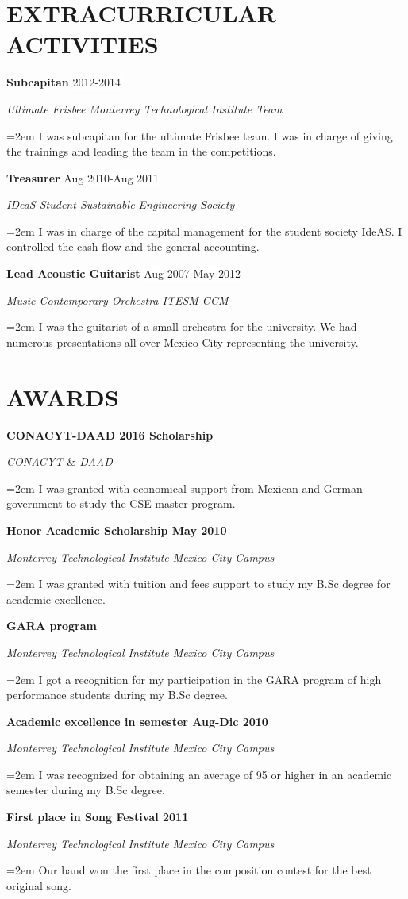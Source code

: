\documentclass[paper=a4,fontsize=11pt]{scrartcl} %
\newcommand{\sepspace}{\vspace*{1em}}		%
\newcommand{\NewPart}[1]{\section*{\uppercase{#1}}}
\newcommand{\EducationEntry}[4]{
		\noindent \textbf{#1} \hfill      %
		\colorbox{white}{%
			\parbox{15em}{%
			\hfill\color{black}#2}} \par  %
		\noindent \textit{#3} \par        %
		\noindent\hangindent=2em\hangafter=0 \small #4 %
		\normalsize \par}
\newcommand{\extraAct}[4]{				  %
		\noindent \textbf{#1} \hfill      %
		\colorbox{White}{\color{Black}#2} \par  %
		\noindent \textit{#3} \par              %
		\noindent\hangindent=2em\hangafter=0 \small #4 %
		\normalsize \par}
\begin{document}
\NewPart{Extracurricular Activities}{}



\extraAct{Subcapitan}{2012-2014}{Ultimate Frisbee Monterrey Technological Institute Team}{I was subcapitan for the ultimate Frisbee team. I was in charge of giving the trainings and leading the team in the competitions.}  
\sepspace

\extraAct{Treasurer}{Aug 2010-Aug 2011}{IDeaS Student Sustainable Engineering Society}{I was in charge of the capital management for the student society IdeAS. I controlled the cash flow and the general accounting.}
\sepspace

\extraAct{Lead Acoustic Guitarist}{Aug 2007-May 2012}{Music Contemporary Orchestra ITESM CCM}{I was the guitarist of a small orchestra for the university. We had numerous presentations all over Mexico City representing the university.}
\sepspace



\NewPart{Awards}{}

\extraAct{CONACYT-DAAD 2016 Scholarship}{}{CONACYT $\&$ DAAD}{I was granted with economical support from Mexican and German government to study the CSE master program.}
\sepspace

\extraAct{Honor Academic Scholarship May 2010}{}{Monterrey Technological Institute Mexico City Campus}{I was granted with tuition and fees support to study my B.Sc degree for academic excellence.}
\sepspace

\extraAct{GARA program}{}{Monterrey Technological Institute Mexico City Campus}{I got a recognition for my participation in the GARA program of high performance students during my B.Sc degree.}
\sepspace

\extraAct{Academic excellence in semester Aug-Dic 2010 }{}{Monterrey Technological Institute Mexico City Campus}{I was recognized for obtaining an average of 95 or higher in an academic semester during my B.Sc degree.}
\sepspace

\extraAct{First place in Song Festival 2011}{}{Monterrey Technological Institute Mexico City Campus}{Our band won the first place in the composition contest for the best original song.}
\sepspace
\end{document}
